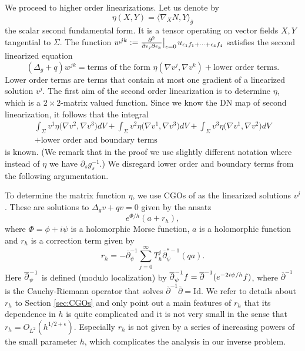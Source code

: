 \documentclass[12pt]{amsart}
\def\p{\partial}
\theoremstyle{definition}
\theoremstyle{remark}
\newcommand{\eps}{\epsilon}
\newcommand{\s}{\hspace{0.5pt}}
\newcommand{\op}{\overline \p}
\begin{document}
We proceed to higher order linearizations. Let us denote by
\[
 \eta(X,Y)=\langle \nabla_XN,Y\rangle_{\overline g}
\]
the scalar second fundamental form. It is a tensor operating on vector fields $X,Y$ tangential to $\Sigma$. The function $w^{jk}:=\frac{\p^2}{\p \eps_j\p \eps_k}\big|_{\eps=0}\s\s u_{\eps_1f_1+ \cdots + \eps_4f_4}$ satisfies the second linearized equation 
\[
 (\Delta_g+q)w^{jk}= \text{terms of the form } \eta(\nabla v^j, \nabla v^k)+ \text{lower order terms}. %
 \]
Lower order terms are terms that contain at most one gradient of a linearized solution $v^j$. The first aim of the second order linearization is to determine $\eta$, which is a $2\times 2$-matrix valued function. Since we know the DN map of second linearization, it follows that the integral 
\begin{multline}\label{eq:known_integral_2}
\int_{\Sigma} v^1 \eta(\nabla v^2,\nabla v^3\big)dV+\int_{\Sigma}v^2 \eta(\nabla v^1,\nabla v^3\big)dV +\int_{\Sigma} v^3 \eta(\nabla v^1,\nabla v^2\big)dV \\
+ \text{lower order and boundary terms}
 \end{multline}
is known. (We remark that in the proof we use slightly different notation where instead of $\eta$ we have $\p_sg_s^{-1}$.) We disregard lower order and boundary terms from the following argumentation.

To determine the matrix function $\eta$, we use CGOs of \cite{guillarmou2011identification} as the linearized solutions $v^j$. These are solutions to $\Delta_gv+qv=0$ given by the ansatz
\[
 e^{\Phi/h}(a+r_h),
\]
where $\Phi=\phi+i\psi$ is a holomorphic Morse function, $a$ is a holomorphic function and $r_h$ is a correction term given by 
\[
r_h=-  \overline{\p}_\psi^{-1}\sum_{j=0}^\infty T_h^j\op_\psi^{*-1}(qa).
\]
Here $\overline \p_\psi^{\s -1}$ is defined (modulo localization) by $\overline \p_\psi^{\s-1}f =\overline \p^{-1}(e^{-2i\psi/h}f)$, where $\overline \p^{-1}$ is the Cauchy-Riemann operator that solves $\overline \p^{-1}\op=\text{Id}$. We refer to details about $r_h$ to  
Section \ref{sec:CGOs} and only point out a main features of $r_h$ that its dependence in $h$ is quite complicated and it is not very small in the sense that $r_h=O_{L^2}(h^{1/2+\eps})$.  Especially $r_h$ is not given by a series of increasing powers of the small parameter $h$, which complicates the analysis in our inverse problem. %
\end{document}
